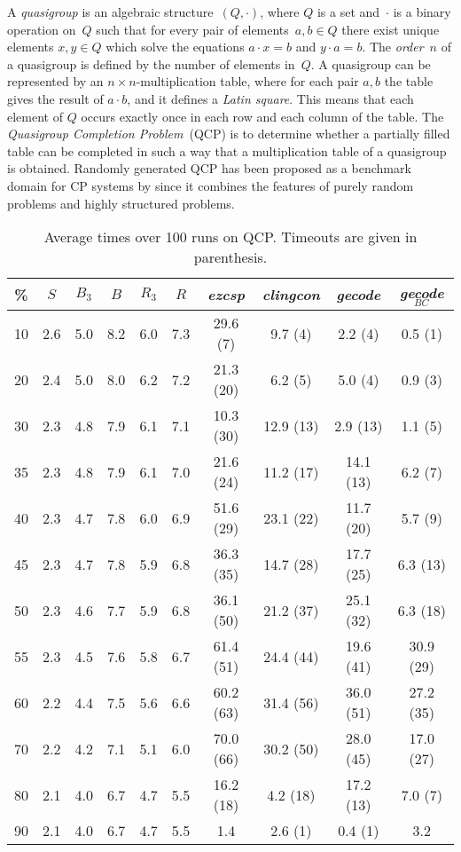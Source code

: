\documentclass{tlp}
\newcommand{\systemname}[1]{\emph{#1}}
\newcommand{\encsup}{$S$}
\newcommand{\encbou}{$B$}
\newcommand{\encran}{$R$}
\newcommand{\encbouh}[1]{\encbou$_{#1}$}
\newcommand{\encranh}[1]{\encran$_{#1}$}
\begin{document}
A \emph{quasigroup} is an algebraic structure~$(Q,\cdot)$, where $Q$ is a set and~$\cdot$ is a binary operation on~$Q$ such that for every pair of elements~$a,b \in Q$ there exist unique elements $x,y \in Q$ which solve the equations $a \cdot x = b$ and $y \cdot a = b$. The \emph{order}~$n$ of a quasigroup is defined by the number of elements in~$Q$. A quasigroup can be represented by an $n \times n$-multiplication table, where for each pair $a,b$ the table gives the result of $a \cdot b$, and it defines a \emph{Latin square}. This means that each element of $Q$ occurs exactly once in each row and each column of the table. 
The \emph{Quasigroup Completion Problem}~(QCP) is to determine whether a partially filled table can be completed in such a way that a multiplication table of a quasigroup is obtained.
Randomly generated QCP has been proposed as a benchmark domain for CP systems by  since it combines the features of purely random problems and highly structured problems.
\begin{table}
\caption{Average times over 100 runs on QCP. Timeouts are given in parenthesis.}
\label{tab:qcp}
\begin{minipage}{\textwidth}
\begin{tabular}{cccccccccc} \hline\hline
\% & \encsup & \encbouh{3} & \encbou & \encranh{3} & \encran & \systemname{ezcsp} & \systemname{clingcon} & \systemname{gecode} & \systemname{gecode}$_{BC}$ \\ \hline
10 & 2.6 & 5.0 & 8.2 & 6.0 & 7.3 &29.6 (7) & 9.7 (4) & 2.2 (4) & 0.5 (1) \\
20 & 2.4 & 5.0 & 8.0 & 6.2 & 7.2 &21.3 (20) & 6.2 (5) & 5.0 (4) & 0.9 (3) \\
30 & 2.3 & 4.8 & 7.9 & 6.1 & 7.1 &10.3 (30) & 12.9 (13) & 2.9 (13) & 1.1 (5) \\
35 & 2.3 & 4.8 & 7.9 & 6.1 & 7.0 &21.6 (24) & 11.2 (17) &14.1 (13) & 6.2 (7) \\
40 & 2.3 & 4.7 & 7.8 & 6.0 & 6.9 &51.6 (29) & 23.1 (22) &11.7 (20) & 5.7 (9) \\
45 & 2.3 & 4.7 & 7.8 & 5.9 & 6.8 &36.3 (35) & 14.7 (28) &17.7 (25) & 6.3 (13) \\
50 & 2.3 & 4.6 & 7.7 & 5.9 & 6.8 &36.1 (50) & 21.2 (37) &25.1 (32) & 6.3 (18) \\
55 & 2.3 & 4.5 & 7.6 & 5.8 & 6.7 &61.4 (51) & 24.4 (44) &19.6 (41) &30.9 (29) \\
60 & 2.2 & 4.4 & 7.5 & 5.6 & 6.6 &60.2 (63) & 31.4 (56) &36.0 (51) &27.2 (35) \\
70 & 2.2 & 4.2 & 7.1 & 5.1 & 6.0 &70.0 (66) & 30.2 (50) &28.0 (45) &17.0 (27) \\
80 & 2.1 & 4.0 & 6.7 & 4.7 & 5.5 &16.2 (18) & 4.2 (18) &17.2 (13) & 7.0 (7) \\
90 & 2.1 & 4.0 & 6.7 & 4.7 & 5.5 & 1.4 & 2.6 (1) & 0.4 (1) & 3.2 \\ \hline\hline
\end{tabular}
\vspace{-2\baselineskip}
\end{minipage}
\end{table}
\end{document}
